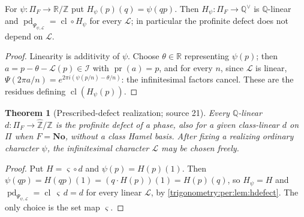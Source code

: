\documentclass[11pt,letterpaper]{article}
\numberwithin{equation}{section}
\newtheorem{theorem}{Theorem}[section]
\theoremstyle{definition}
\theoremstyle{remark}
\newcommand{\No}{\mathbf{No}}
\newcommand{\R}{\mathbb R}
\newcommand{\Q}{\mathbb Q}
\newcommand{\Z}{\mathbb Z}
\newcommand{\pr}{\operatorname{pr}}
\newcommand{\pd}{\operatorname{pd}}
\newcommand{\cl}{\operatorname{cl}}
\newcommand{\Zhat}{\widehat{\Z}}
\newcommand{\Qv}{\Q^{\vee}}
\newcommand{\cI}{\mathcal I}
\newcommand{\cL}{\mathcal L}
\begin{document}
\begin{lemma}\label{trigonometry:per:lem:hdefect}
For $\psi:\Pi_F\to\R/\Z$ put $H_\psi(p)(q)=\psi(qp)$. Then $H_\psi:\Pi_F\to\Qv$ is $\Q$-linear and
$\pd_{\Psi_{\psi,\cL}}=\cl\circ H_\psi$ for every $\cL$; in particular the profinite defect does not
depend on $\cL$.
\end{lemma}
\begin{proof}
Linearity is additivity of $\psi$. Choose $\theta\in\R$ representing $\psi(p)$; then
$a=p-\theta-\cL(p)\in\cI$ with $\pr(a)=p$, and for every $n$, since $\cL$ is linear,
$\Psi(2\pi a/n)=e^{2\pi i(\psi(p/n)-\theta/n)}$: the infinitesimal factors cancel. These are the residues
defining $\cl(H_\psi(p))$.
\end{proof}

\begin{theorem}[Prescribed-defect realization; source 21]\label{trigonometry:per:thm:realize}
Every $\Q$-linear $d:\Pi_F\to\Zhat/\Z$ is the profinite defect of a phase, also for a given
class-linear $d$ on $\Pi$ when $F=\No$, without a class Hamel basis. After fixing a realizing
ordinary character $\psi$, the infinitesimal character $\cL$ may be chosen freely.
\end{theorem}
\begin{proof}
Put $H=\varsigma\circ d$ and $\psi(p)=H(p)(1)$. Then $\psi(qp)=H(qp)(1)=(q\cdot H(p))(1)=H(p)(q)$, so
$H_\psi=H$ and $\pd_{\Psi_{\psi,\cL}}=\cl\,\varsigma\,d=d$ for every linear $\cL$, by
\cref{trigonometry:per:lem:hdefect}. The only choice is the set map $\varsigma$.
\end{proof}
\end{document}
